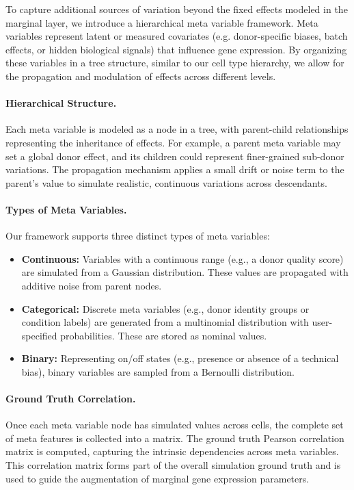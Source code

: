 \documentclass{article}
\begin{document}
To capture additional sources of variation beyond the fixed effects modeled in the marginal layer, we introduce a hierarchical meta variable framework. Meta variables represent latent or measured covariates (e.g. donor-specific biases, batch effects, or hidden biological signals) that influence gene expression. By organizing these variables in a tree structure, similar to our cell type hierarchy, we allow for the propagation and modulation of effects across different levels.

\paragraph{Hierarchical Structure.}
Each meta variable is modeled as a node in a tree, with parent-child relationships representing the inheritance of effects. For example, a parent meta variable may set a global donor effect, and its children could represent finer-grained sub-donor variations. The propagation mechanism applies a small drift or noise term to the parent's value to simulate realistic, continuous variations across descendants.

\paragraph{Types of Meta Variables.}
Our framework supports three distinct types of meta variables:
\begin{itemize}
	\item \textbf{Continuous:} Variables with a continuous range (e.g., a donor quality score) are simulated from a Gaussian distribution. These values are propagated with additive noise from parent nodes.
	\item \textbf{Categorical:} Discrete meta variables (e.g., donor identity groups or condition labels) are generated from a multinomial distribution with user-specified probabilities. These are stored as nominal values.
	\item \textbf{Binary:} Representing on/off states (e.g., presence or absence of a technical bias), binary variables are sampled from a Bernoulli distribution.
\end{itemize}

\paragraph{Ground Truth Correlation.}
Once each meta variable node has simulated values across cells, the complete set of meta features is collected into a matrix. The ground truth Pearson correlation matrix is computed, capturing the intrinsic dependencies across meta variables. This correlation matrix forms part of the overall simulation ground truth and is used to guide the augmentation of marginal gene expression parameters.
\end{document}
